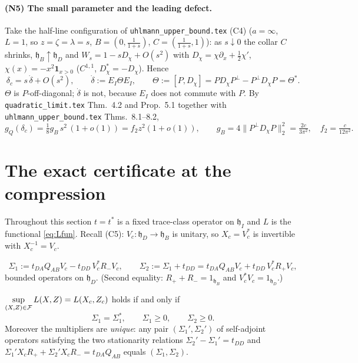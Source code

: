\documentclass[11pt]{article}
\begin{document}
\paragraph{(N5) The small parameter and the leading defect.}
Take the half-line configuration of \texttt{uhlmann\_upper\_bound.tex} (C4)
($a=\infty$, $L=1$, so $z=\zeta=\lambda=s$, $B=(0,\frac1{1+s})$, $C=(\frac1{1+s},1)$):
as $s\downarrow0$ the collar $C$ shrinks, $\mathfrak h_B\uparrow\mathfrak h_D$ and
$W_s=1-sD_\chi+O(s^2)$ with $D_\chi=\chi\partial_x+\frac12\chi'$,
$\chi(x)=-x^2\mathbf 1_{x>0}$ ($C^{1,1}$, $D_\chi^*=-D_\chi$).  Hence
\begin{equation}\label{eq:dotdelta}
 \delta_c=s\,\dot\delta+O(s^2),\qquad \dot\delta:=E_I\Theta E_I,\qquad
 \Theta:=[P,D_\chi]=PD_\chi P^\perp-P^\perp D_\chi P=\Theta^* .
\end{equation}
$\Theta$ is $P$-off-diagonal; $\dot\delta$ is not, because $E_I$ does not commute with $P$.
By \texttt{quadratic\_limit.tex} Thm.~4.2 and Prop.~5.1 together with
\texttt{uhlmann\_upper\_bound.tex} Thms.~8.1--8.2,
\begin{equation}\label{eq:gQdc}
 g_Q(\delta_c)=\tfrac18 g_B\,s^2\,(1+o(1))=f_2z^2(1+o(1)),\qquad
 g_B=4\|P^\perp D_\chi P\|_2^2=\tfrac{2c}{3\pi^2},\quad f_2=\tfrac{c}{12\pi^2}.
\end{equation}

\section{The exact certificate at the compression}\label{sec:kkt}

Throughout this section $t=t^*$ is a fixed trace-class operator on $\mathfrak h_I$ and
$L$ is the functional \eqref{eq:Lfun}.  Recall (C5): $V_c:\mathfrak h_D\to\mathfrak h_B$ is
unitary, so $X_c=V_c^*$ is invertible with $X_c^{-1}=V_c$.

\begin{definition}\label{def:sigma}
\begin{equation}\label{eq:sigmas}
 \Sigma_1:=t_{DA}Q_{AB}V_c-t_{DD}\,V_c^*R_-V_c ,\qquad
 \Sigma_2:=\Sigma_1+t_{DD}=t_{DA}Q_{AB}V_c+t_{DD}\,V_c^*R_+V_c ,
\end{equation}
bounded operators on $\mathfrak h_D$.  (Second equality: $R_++R_-=1_{\mathfrak h_B}$ and
$V_c^*V_c=1_{\mathfrak h_D}$.)
\end{definition}

\begin{theorem}\label{thm:kkt}
$\displaystyle\sup_{(X,Z)\in\mathcal F}L(X,Z)=L(X_c,Z_c)$ holds if and only if
\begin{equation}\label{eq:cert}
 \Sigma_1=\Sigma_1^*,\qquad \Sigma_1\ge0,\qquad \Sigma_2\ge0 .
\end{equation}
Moreover the multipliers are \emph{unique}: any pair $(\Sigma_1',\Sigma_2')$ of
self-adjoint operators satisfying the two stationarity relations
$\Sigma_2'-\Sigma_1'=t_{DD}$ and $\Sigma_1'X_cR_++\Sigma_2'X_cR_-=t_{DA}Q_{AB}$
equals $(\Sigma_1,\Sigma_2)$.
\end{theorem}
\end{document}
